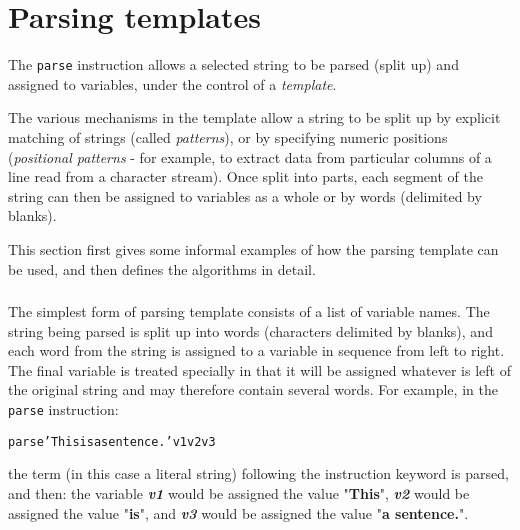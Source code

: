 \chapter{Parsing templates}\label{refparsing}
\index{,}
\index{,}
\index{,}
 The \texttt{parse} instruction allows a selected string to
be parsed (split up) and assigned to variables, under the control of a
\emph{template}.
 
The various mechanisms in the template allow a string to be split up by
explicit matching of strings (called \emph{patterns}), or by
specifying numeric positions (\emph{positional patterns} - for
example, to extract data from particular columns of a line read from a
character stream).
Once split into parts, each segment of the string can then be assigned
to variables as a whole or by words (delimited by blanks).
 
This section first gives some informal examples of how the parsing
template can be used, and then defines the algorithms in detail.
\subsection{}\label{}
 The simplest form of parsing template consists of a list of variable
names.
The string being parsed is split up into words (characters delimited by
blanks), and each word from the string is assigned to a
variable in sequence from left to right.
The final variable is treated specially in that it will be assigned
whatever is left of the original string and may therefore contain
several words.
For example, in the \texttt{parse} instruction:
\begin{alltt}
parse 'This is a sentence.' v1 v2 v3
\end{alltt}
the term (in this case a literal string) following the instruction
keyword is parsed, and then:  the variable \textbf{\emph{v1}}
would be assigned the value "\textbf{This}", \textbf{\emph{v2}}
would be assigned the value "\textbf{is}",
and \textbf{\emph{v3}} would be assigned the
value "\textbf{a sentence.}".
 
